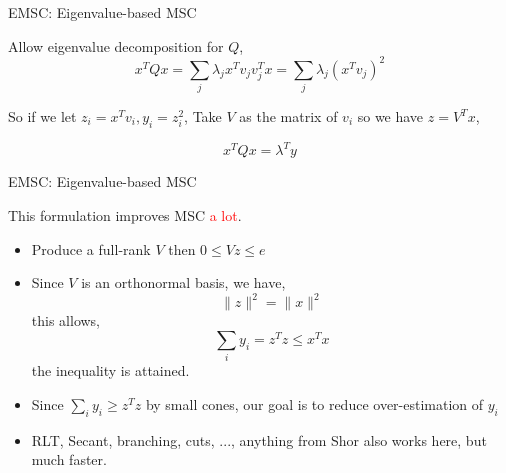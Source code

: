 


\begin{frame}{EMSC: Eigenvalue-based MSC}

  Allow eigenvalue decomposition for \(Q\),
  \[x^TQx = \sum_j \lambda_j x^Tv_jv_j^Tx = \sum_j \lambda_j (x^Tv_j)^2\]

  So if we let \(z_i = x^Tv_i, y_i = z_i^2\), Take \(V\) as the matrix of \(v_i\) so we have \(z = V^Tx\),

  \[x^TQx = \lambda^Ty\]
\end{frame}

\begin{frame}{EMSC: Eigenvalue-based MSC}

  This formulation improves MSC \textcolor{red}{a lot}.
  \begin{itemize}

    \item Produce a full-rank \(V\) then \(0 \le Vz \le e \)
    \item Since \(V\) is an orthonormal basis, we have,
          \[\|z\|^2 = \|x\|^2\]
          this allows,
          \[\sum_i y_i = z^Tz \le x^Tx\]
          the inequality is attained.
    \item Since \(\sum_i y_i \ge z^Tz\) by small cones, our goal is to reduce over-estimation of \(y_i\)
    \item RLT, Secant, branching, cuts, ..., anything from Shor also works here, but much faster.
  \end{itemize}
\end{frame}


